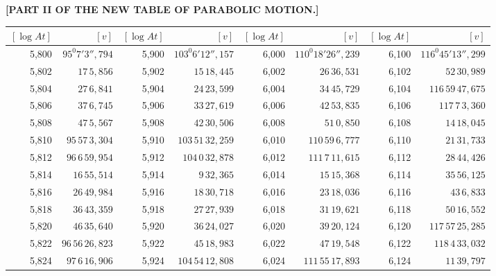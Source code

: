 \clearpage
{}
\begingroup
\centering
\fontsize{9}{9}\selectfont
\setlength{\tabcolsep}{1pt}
\renewcommand{\arraystretch}{.9}
\setlength{\parskip}{0pt}
\textbf{[PART II OF THE NEW TABLE OF PARABOLIC MOTION.]}
\par\vspace{7pt}
\begin{tabular}{|r|r||r|r||r|r||r|r|}
\hline
\([\log At]\) & \([v]\) & \([\log At]\) & \([v]\) & \([\log At]\) & \([v]\) & \([\log At]\) & \([v]\) \\
\hline
5,800 & \(95^{0}7'3'',\!794\) & 5,900 & \(103^{0}6'12'',\!157\) & 6,000 & \(110^{0}18'26'',\!239\) & 6,100 & \(116^{0}45'13'',\!299\) \\[1pt]
5,802 & \(17\,5,\!856\) & 5,902 & \(15\,18,\!445\) & 6,002 & \(26\,36,\!531\) & 6,102 & \(52\,30,\!989\) \\
5,804 & \(27\,6,\!841\) & 5,904 & \(24\,23,\!599\) & 6,004 & \(34\,45,\!729\) & 6,104 & \(116\,59\,47,\!675\) \\
5,806 & \(37\,6,\!745\) & 5,906 & \(33\,27,\!619\) & 6,006 & \(42\,53,\!835\) & 6,106 & \(117\,7\,3,\!360\) \\
5,808 & \(47\,5,\!567\) & 5,908 & \(42\,30,\!506\) & 6,008 & \(51\,0,\!850\) & 6,108 & \(14\,18,\!045\) \\
5,810 & \(95\,57\,3,\!304\) & 5,910 & \(103\,51\,32,\!259\) & 6,010 & \(110\,59\,6,\!777\) & 6,110 & \(21\,31,\!733\) \\[1pt]
5,812 & \(96\,6\,59,\!954\) & 5,912 & \(104\,0\,32,\!878\) & 6,012 & \(111\,7\,11,\!615\) & 6,112 & \(28\,44,\!426\) \\
5,814 & \(16\,55,\!514\) & 5,914 & \(9\,32,\!365\) & 6,014 & \(15\,15,\!368\) & 6,114 & \(35\,56,\!125\) \\
5,816 & \(26\,49,\!984\) & 5,916 & \(18\,30,\!718\) & 6,016 & \(23\,18,\!036\) & 6,116 & \(43\,6,\!833\) \\
5,818 & \(36\,43,\!359\) & 5,918 & \(27\,27,\!939\) & 6,018 & \(31\,19,\!621\) & 6,118 & \(50\,16,\!552\) \\
5,820 & \(46\,35,\!640\) & 5,920 & \(36\,24,\!027\) & 6,020 & \(39\,20,\!124\) & 6,120 & \(117\,57\,25,\!285\) \\[1pt]
5,822 & \(96\,56\,26,\!823\) & 5,922 & \(45\,18,\!983\) & 6,022 & \(47\,19,\!548\) & 6,122 & \(118\,4\,33,\!032\) \\
5,824 & \(97\,6\,16,\!906\) & 5,924 & \(104\,54\,12,\!808\) & 6,024 & \(111\,55\,17,\!893\) & 6,124 & \(11\,39,\!797\) \\

\end{tabular}
